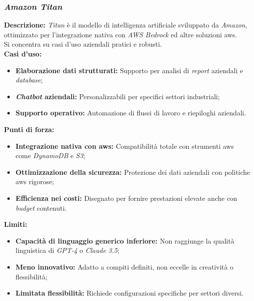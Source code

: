 \subsubsection{\textit{Amazon Titan}}

\noindent \textbf{Descrizione:}
\textit{Titan} è il modello di intelligenza artificiale sviluppato da \textit{Amazon}, ottimizzato per l’integrazione nativa con \textit{AWS Bedrock} ed altre soluzioni \gls{aws}.\\
Si concentra su casi d’uso aziendali pratici e robusti.\\

\noindent \textbf{Casi d’uso:}
\begin{itemize}
    \item \textbf{Elaborazione dati strutturati:} Supporto per analisi di \textit{report} aziendali e \textit{database};
    \item \textbf{\textit{Chatbot} aziendali:} Personalizzabili per specifici settori industriali;
    \item \textbf{Supporto operativo:} Automazione di flussi di lavoro e riepiloghi aziendali.
\end{itemize}

\noindent \textbf{Punti di forza:}
\begin{itemize}
    \item \textbf{Integrazione nativa con \gls{aws}:} Compatibilità totale con strumenti \gls{aws} come \textit{DynamoDB} e \textit{S3};
    \item \textbf{Ottimizzazione della sicurezza:} Protezione dei dati aziendali con politiche \gls{aws} rigorose;
    \item \textbf{Efficienza nei costi:} Disegnato per fornire prestazioni elevate anche con \textit{budget} contenuti.
\end{itemize}

\noindent \textbf{Limiti:}
\begin{itemize}
    \item \textbf{Capacità di linguaggio generico inferiore:} Non raggiunge la qualità linguistica di \textit{GPT-4} o \textit{Claude 3.5};
    \item \textbf{Meno innovativo:} Adatto a compiti definiti, non eccelle in creatività o flessibilità;
    \item \textbf{Limitata flessibilità:} Richiede configurazioni specifiche per settori diversi.
\end{itemize}

\vspace{1.5cm}
